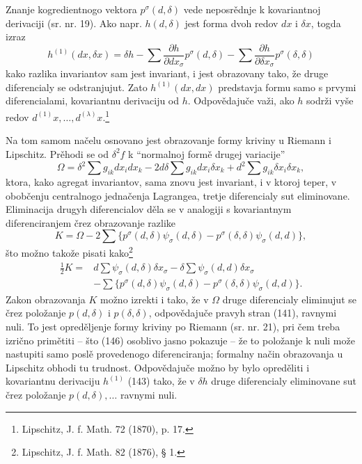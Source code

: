 \documentclass[11pt]{article}
\begin{document}
Znanje kogredientnogo vektora $p^\sigma(d,\delta)$ vede neposrědnje k kovariantnoj derivaciji (sr. nr. 19). Ako napr. $h(d,\delta)$ jest forma dvoh redov $dx$ i $\delta x$, togda izraz
\begin{equation}
 h^{(1)}(dx,\delta x)=\delta h-
 \sum\frac{\partial h}{\partial dx_\sigma}p^\sigma(d,\delta)-
 \sum\frac{\partial h}{\partial \delta x_\sigma}p^\sigma(\delta,\delta)
\tag{143}
\end{equation}
kako razlika invariantov sam jest invariant, i jest obrazovany tako, že druge diferencialy se odstranjujut. Zato $h^{(1)}(dx,dx)$ predstavja formu samo s prvymi diferencialami, kovariantnu derivaciju od $h$. Odpovědajuče važi, ako $h$ sodrži vyše redov $d^{(1)}x,\ldots,d^{(\lambda)}x$.\footnote{Lipschitz, J. f. Math. 72 (1870), p. 17.}

Na tom samom načelu osnovano jest obrazovanje formy kriviny u Riemann i Lipschitz. Prěhodi se od $\delta^2 f$ k ``normalnoj formě drugej variacije''
\begin{equation}
 \Omega=\delta^2\sum g_{ik}dx_i dx_k
 -2d\delta\sum g_{ik}dx_i\delta x_k
 +d^2\sum g_{ik}\delta x_i\delta x_k,
\tag{144}
\end{equation}
ktora, kako agregat invariantov, sama znovu jest invariant, i v ktoroj teper, v obobčenju centralnogo jednačenja Lagrangea, tretje diferencialy sut eliminovane. Eliminacija drugyh diferencialov děla se v analogiji s kovariantnym diferenciranjem črez obrazovanje razlike
\begin{equation}
 K=\Omega-2\sum\{p^\sigma(d,\delta)\psi_\sigma(d,\delta)-p^\sigma(\delta,\delta)\psi_\sigma(d,d)\},
\tag{145}
\end{equation}
što možno takože pisati kako\footnote{Lipschitz, J. f. Math. 82 (1876), § 1.}
\begin{equation}
\begin{aligned}
 \frac12 K={}&d\sum\psi_\sigma(d,\delta)\delta x_\sigma
 -\delta\sum\psi_\sigma(d,d)\delta x_\sigma\\
 &-\sum\{p^\sigma(d,\delta)\psi_\sigma(d,\delta)-p^\sigma(\delta,\delta)\psi_\sigma(d,d)\}.
\end{aligned}
\tag{146}
\end{equation}
Zakon obrazovanja $K$ možno izrekti i tako, že v $\Omega$ druge diferencialy eliminujut se črez položanje $p(d,\delta)$ i $p(\delta,\delta)$, odpovědajuče pravyh stran (141), ravnymi nuli. To jest opreděljenje formy kriviny po Riemann (sr. nr. 21), pri čem treba izrično primětiti -- što (146) osoblivo jasno pokazuje -- že to položanje k nuli može nastupiti samo poslě provedenogo diferenciranja; formalny način obrazovanja u Lipschitz obhodi tu trudnost. Odpovědajuče možno by bylo opreděliti i kovariantnu derivaciju $h^{(1)}$ (143) tako, že v $\delta h$ druge diferencialy eliminovane sut črez položanje $p(d,\delta),\ldots$ ravnymi nuli.
\end{document}
